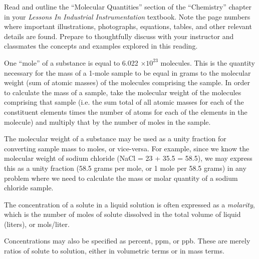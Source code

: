 
Read and outline the ``Molecular Quantities'' section of the ``Chemistry'' chapter in your {\it Lessons In Industrial Instrumentation} textbook.  Note the page numbers where important illustrations, photographs, equations, tables, and other relevant details are found.  Prepare to thoughtfully discuss with your instructor and classmates the concepts and examples explored in this reading.













One ``mole'' of a substance is equal to 6.022 $\times 10^{23}$ molecules.  This is the quantity necessary for the mass of a 1-mole sample to be equal in grams to the molecular weight (sum of atomic masses) of the molecules comprising the sample.  In order to calculate the mass of a sample, take the molecular weight of the molecules comprising that sample (i.e. the sum total of all atomic masses for each of the constituent elements times the number of atoms for each of the elements in the molecule) and multiply that by the number of moles in the sample.

The molecular weight of a substance may be used as a unity fraction for converting sample mass to moles, or vice-versa.  For example, since we know the molecular weight of sodium chloride (NaCl = 23 + 35.5 = 58.5), we may express this as a unity fraction (58.5 grams per mole, or 1 mole per 58.5 grams) in any problem where we need to calculate the mass or molar quantity of a sodium chloride sample.

\vskip 10pt

The concentration of a solute in a liquid solution is often expressed as a {\it molarity}, which is the number of moles of solute dissolved in the total volume of liquid (liters), or mols/liter.

\vskip 10pt

Concentrations may also be specified as percent, ppm, or ppb.  These are merely ratios of solute to solution, either in volumetric terms or in mass terms.


